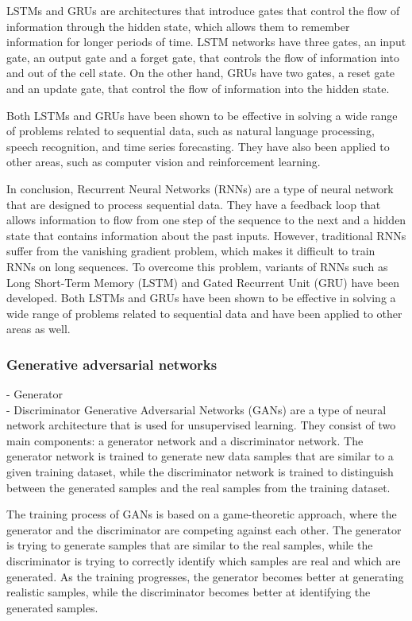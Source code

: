 LSTMs and GRUs are architectures that introduce gates that control the flow of information through the hidden state, which allows them to remember information for longer periods of time. LSTM networks have three gates, an input gate, an output gate and a forget gate, that controls the flow of information into and out of the cell state. On the other hand, GRUs have two gates, a reset gate and an update gate, that control the flow of information into the hidden state.

Both LSTMs and GRUs have been shown to be effective in solving a wide range of problems related to sequential data, such as natural language processing, speech recognition, and time series forecasting. They have also been applied to other areas, such as computer vision and reinforcement learning.

In conclusion, Recurrent Neural Networks (RNNs) are a type of neural network that are designed to process sequential data. They have a feedback loop that allows information to flow from one step of the sequence to the next and a hidden state that contains information about the past inputs. However, traditional RNNs suffer from the vanishing gradient problem, which makes it difficult to train RNNs on long sequences. To overcome this problem, variants of RNNs such as Long Short-Term Memory (LSTM) and Gated Recurrent Unit (GRU) have been developed. Both LSTMs and GRUs have been shown to be effective in solving a wide range of problems related to sequential data and have been applied to other areas as well.

\subsubsection{Generative adversarial networks}
- Generator\\
- Discriminator
Generative Adversarial Networks (GANs) are a type of neural network architecture that is used for unsupervised learning. They consist of two main components: a generator network and a discriminator network. The generator network is trained to generate new data samples that are similar to a given training dataset, while the discriminator network is trained to distinguish between the generated samples and the real samples from the training dataset.

The training process of GANs is based on a game-theoretic approach, where the generator and the discriminator are competing against each other. The generator is trying to generate samples that are similar to the real samples, while the discriminator is trying to correctly identify which samples are real and which are generated. As the training progresses, the generator becomes better at generating realistic samples, while the discriminator becomes better at identifying the generated samples.

